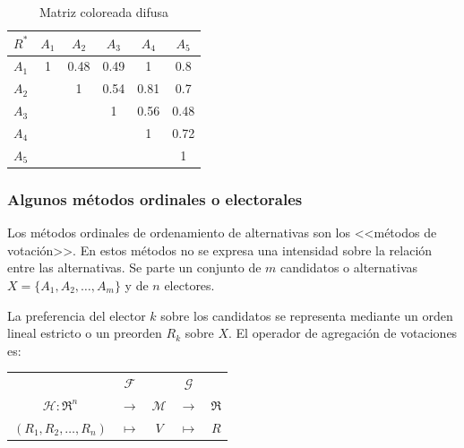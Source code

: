 \documentclass[a5paper,doc,10pt,noapacite]{apa6}
\begin{document}
{{\begin{table}[H]
   \fontsize{7}{11}\selectfont
   	\captionsetup{justification=centering, labelfont=footnotesize, font=footnotesize}
    \centering
	\begin{tabular}{c|ccccc} \thickline
	\(R^*\) & \(A_1\) & \(A_2\) & \(A_3\) & \(A_4\) & \(A_5\)  \\ \hline
    \(A_1\) & \cellcolor{pastelyellow} 1 & \cellcolor{pastelyellow} 0.48 & \cellcolor{pastelgray} 0.49 & \cellcolor{paleblue} 1 & \cellcolor{paleblue} 0.8  \\
    \(A_2\) &  & \cellcolor{pastelyellow} 1 & \cellcolor{pastelgray} 0.54 & \cellcolor{paleblue} 0.81 & \cellcolor{paleblue} 0.7  \\
	\(A_3\) &  &  & \cellcolor{pastelyellow} 1 & \cellcolor{palegreen} 0.56 & \cellcolor{pastelgray} 0.48 \\
	\(A_4\) &  &  &  & \cellcolor{pastelyellow} 1 & \cellcolor{paleblue} 0.72   \\
	\(A_5\) &  &  &  &  & \cellcolor{pastelyellow} 1  \\
    \end{tabular}
    \caption*{Matriz coloreada difusa}
\label{tab:B4} 
\end{table}

\subsubsection{Algunos métodos ordinales o electorales}

Los métodos ordinales de ordenamiento de alternativas son los <<métodos de votación>>. En estos métodos no se expresa una intensidad sobre la relación entre las alternativas. Se parte un conjunto de \(m\) candidatos o alternativas \(X = \{A_1, A_2, \dots ,A_m\}\) y de \(n\)  electores. 

\vspace{1\baselineskip}
La preferencia del elector \(k\)  sobre los candidatos se representa mediante un orden lineal estricto o un preorden \(R_k\) sobre \(X\). El operador de agregación de votaciones es:

\begin{table}[H]
\fontsize{7}{11}\selectfont
\begin{center}
\begin{tabular}{c c c c c }
	        & \(\mathcal{F}\) &  & \(\mathcal{G} \)&  \\
    \(\mathcal{H}: \Re ^n\) & \(\rightarrow \) & \(\mathcal{M}\) & \(\rightarrow \)& \(\Re\)  \\
    \((R_1,R_2,\dots, R_n)\) & \(\mapsto\) & \(V\) &  \(\mapsto\) & \(R\) \\
\end{tabular}
\label{tab:B31} 
\end{center}
\end{table}
\vspace{-1\baselineskip}

}}
\end{document}
